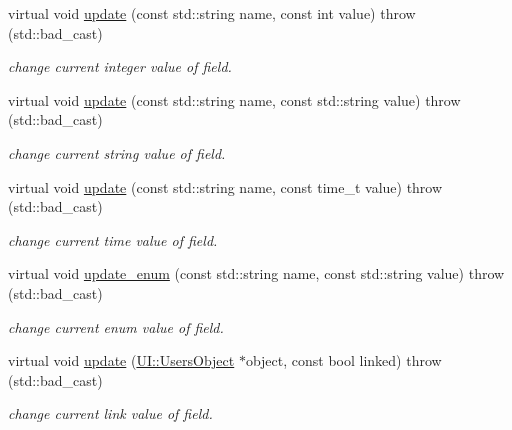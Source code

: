 \begin{DoxyCompactItemize}
virtual void \hyperlink{classCore_1_1AbstractGroup_a18d88f5abb55fa9c829bf6600be58c90}{update} (const std::string name, const int value)  throw (std::bad\_\-cast)
\begin{DoxyCompactList}\small\item\em change current integer value of field. \item\end{DoxyCompactList}\item 
virtual void \hyperlink{classCore_1_1AbstractGroup_a39c1a34ff912b5abd298f58bf6196a45}{update} (const std::string name, const std::string value)  throw (std::bad\_\-cast)
\begin{DoxyCompactList}\small\item\em change current string value of field. \item\end{DoxyCompactList}\item 
virtual void \hyperlink{classCore_1_1AbstractGroup_a9891a3850584dc3677563aea603fb9c2}{update} (const std::string name, const time\_\-t value)  throw (std::bad\_\-cast)
\begin{DoxyCompactList}\small\item\em change current time value of field. \item\end{DoxyCompactList}\item 
virtual void \hyperlink{classCore_1_1AbstractGroup_a1f379a7c4d54b49db4d20127521a238a}{update\_\-enum} (const std::string name, const std::string value)  throw (std::bad\_\-cast)
\begin{DoxyCompactList}\small\item\em change current enum value of field. \item\end{DoxyCompactList}\item 
virtual void \hyperlink{classCore_1_1AbstractGroup_a1b3a59bf11da1ea7bd9a0735cb54dbb8}{update} (\hyperlink{classUI_1_1UsersObject}{UI::UsersObject} $\ast$object, const bool linked)  throw (std::bad\_\-cast)
\begin{DoxyCompactList}\small\item\em change current link value of field. \item\end{DoxyCompactList}\end{DoxyCompactItemize}
